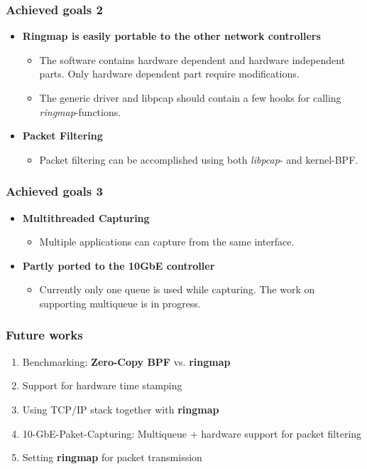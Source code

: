 \documentclass{beamer}
\begin{document}
\begin{frame}
\frametitle{Achieved goals 2}
\begin{itemize}
	\item \textbf{Ringmap is easily portable to the other network controllers}
		\begin{itemize}
			\item The software contains hardware dependent and hardware
				independent parts. Only hardware dependent part require
				modifications.
			\item The generic driver and libpcap should contain a few hooks for calling
				\emph{ringmap}-functions.
		\end{itemize}
	\item \textbf{Packet Filtering}
		\begin{itemize}
			\item Packet filtering can be accomplished using both
				\emph{libpcap}- and kernel-BPF.
		\end{itemize}
\end{itemize}
\end{frame}
\begin{frame}
\frametitle{Achieved goals 3}
\begin{itemize}
	\item \textbf{Multithreaded Capturing}
		\begin{itemize}
			\item Multiple applications can capture from the same interface. 
		\end{itemize}
	\item \textbf{Partly ported to the 10GbE controller}
		\begin{itemize}
			\item Currently only one queue is used while capturing. The work on
				supporting multiqueue is in progress.
		\end{itemize}
\end{itemize}
\end{frame}
\begin{frame}
\frametitle{Future works}
\begin{enumerate}
	\item Benchmarking:  \textbf{Zero-Copy BPF} vs. \textbf{ringmap}
	\item Support for hardware time stamping
	\item Using TCP/IP stack together with \textbf{ringmap}
	\item 10-GbE-Paket-Capturing: Multiqueue + hardware support for packet filtering 
	\item Setting \textbf{ringmap} for packet transmission 
\end{enumerate}
\end{frame}
\end{document}
